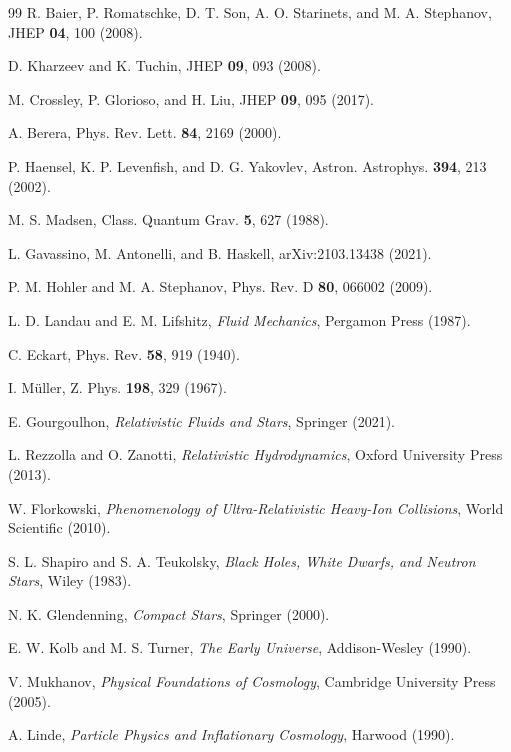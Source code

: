\documentclass[aps,prd,reprint,superscriptaddress,floatfix]{revtex4-2}
\begin{document}
\begin{thebibliography}{99}
R. Baier, P. Romatschke, D. T. Son, A. O. Starinets, and M. A. Stephanov, JHEP \textbf{04}, 100 (2008).

D. Kharzeev and K. Tuchin, JHEP \textbf{09}, 093 (2008).

M. Crossley, P. Glorioso, and H. Liu, JHEP \textbf{09}, 095 (2017).

A. Berera, Phys. Rev. Lett. \textbf{84}, 2169 (2000).

P. Haensel, K. P. Levenfish, and D. G. Yakovlev, Astron. Astrophys. \textbf{394}, 213 (2002).

M. S. Madsen, Class. Quantum Grav. \textbf{5}, 627 (1988).

L. Gavassino, M. Antonelli, and B. Haskell, arXiv:2103.13438 (2021).

P. M. Hohler and M. A. Stephanov, Phys. Rev. D \textbf{80}, 066002 (2009).

L. D. Landau and E. M. Lifshitz, \emph{Fluid Mechanics}, Pergamon Press (1987).

C. Eckart, Phys. Rev. \textbf{58}, 919 (1940).

I. Müller, Z. Phys. \textbf{198}, 329 (1967).

E. Gourgoulhon, \emph{Relativistic Fluids and Stars}, Springer (2021).

L. Rezzolla and O. Zanotti, \emph{Relativistic Hydrodynamics}, Oxford University Press (2013).

W. Florkowski, \emph{Phenomenology of Ultra-Relativistic Heavy-Ion Collisions}, World Scientific (2010).

S. L. Shapiro and S. A. Teukolsky, \emph{Black Holes, White Dwarfs, and Neutron Stars}, Wiley (1983).

N. K. Glendenning, \emph{Compact Stars}, Springer (2000).

E. W. Kolb and M. S. Turner, \emph{The Early Universe}, Addison-Wesley (1990).

V. Mukhanov, \emph{Physical Foundations of Cosmology}, Cambridge University Press (2005).

A. Linde, \emph{Particle Physics and Inflationary Cosmology}, Harwood (1990).


\end{thebibliography}
\end{document}
